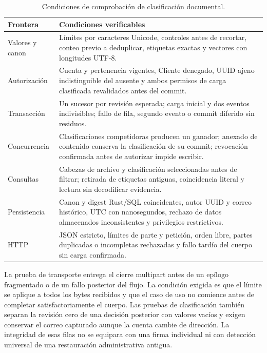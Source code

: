 \begin{table}[H]
  \centering
  \caption{Condiciones de comprobación de clasificación documental.}
  \label{tab:pruebas-clasificacion}
  \begin{tabularx}{\linewidth}{@{}L{3.2cm} X@{}}
    \toprule
    \textbf{Frontera} & \textbf{Condiciones verificables} \\
    \midrule
    Valores y canon & Límites por caracteres Unicode, controles antes de recortar, conteo previo a deduplicar, etiquetas exactas y vectores con longitudes UTF-8. \\
    Autorización & Cuenta y pertenencia vigentes, Cliente denegado, UUID ajeno indistinguible del ausente y ambos permisos de carga clasificada revalidados antes del commit. \\
    Transacción & Un sucesor por revisión esperada; carga inicial y dos eventos indivisibles; fallo de fila, segundo evento o commit diferido sin residuos. \\
    Concurrencia & Clasificaciones competidoras producen un ganador; anexado de contenido conserva la clasificación de su commit; revocación confirmada antes de autorizar impide escribir. \\
    Consultas & Cabezas de archivo y clasificación seleccionadas antes de filtrar; retirada de etiquetas antiguas, coincidencia literal y lectura sin decodificar evidencia. \\
    Persistencia & Canon y digest Rust/SQL coincidentes, autor UUID y correo histórico, UTC con nanosegundos, rechazo de datos almacenados inconsistentes y privilegios restrictivos. \\
    HTTP & JSON estricto, límites de parte y petición, orden libre, partes duplicadas o incompletas rechazadas y fallo tardío del cuerpo sin carga confirmada. \\
    \bottomrule
  \end{tabularx}
\end{table}

La prueba de transporte entrega el cierre multipart antes de un epílogo fragmentado o de un fallo posterior del flujo. La condición exigida es que el límite se aplique a todos los bytes recibidos y que el caso de uso no comience antes de completar satisfactoriamente el cuerpo. Las pruebas de clasificación también separan la revisión cero de una decisión posterior con valores vacíos y exigen conservar el correo capturado aunque la cuenta cambie de dirección. La integridad de esas filas no se equipara con una firma individual ni con detección universal de una restauración administrativa antigua.

